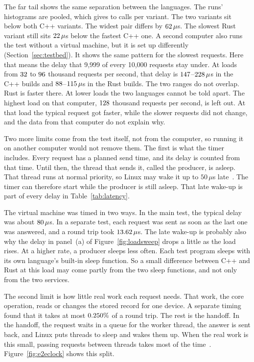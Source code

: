 \documentclass[english,oneside,a4paper,censored,csm,software-track-2020]{HYthesisML}
\begin{document}
The far tail shows the same separation between the languages.
The runs' histograms are pooled, which
gives \FarTailSamplesMin{} to \FarTailSamplesMax{} calls per variant. The
two \FarTailLower{} variants sit below both C++ variants. The widest pair
differs by $62\,\mu$s. The slowest Rust variant still sits
$22\,\mu$s below the fastest C++ one. A second computer also runs the test without a virtual machine, but it is set
up differently (Section~\ref{sec:testbed}). It shows the same pattern for the
slowest requests. Here that means the delay that 9{,}999 of every 10{,}000
requests stay under. At loads from $32$ to $96$
thousand requests per second, that delay is
$147$--$228\,\mu$s in the C++ builds and
$88$--$115\,\mu$s in the Rust builds. The two ranges
do not overlap. Rust is faster there. At lower loads the two languages cannot
be told apart. The highest load on that computer, $128$ thousand
requests per second, is left out. At that load the typical request got faster,
while the slower requests did not change, and the data from that computer do
not explain why.

Two more limits come from the test itself, not from the computer, so running it
on another computer would not remove them. The first is what the timer
includes. Every request has a planned send time, and its delay is counted from
that time. Until then, the thread that sends it, called the producer, is
asleep. That thread runs at normal priority, so Linux may wake it up to
$50\,\mu$s late~\cite{linux2026timerslack}. The timer can therefore start while
the producer is still asleep. That late wake-up is part of every delay in
Table~\ref{tab:latency}.

The virtual machine was timed in two ways. In the main test, the typical delay
was about $80\,\mu$s. In a separate test, each request was sent as
soon as the last one was answered, and a round trip took $13.62\,\mu$s.
The late wake-up is probably also why the delay in panel~(a) of
Figure~\ref{fig:loadsweep} drops a little as the load rises. At a higher rate,
a producer sleeps less often. Each test program sleeps with its own language's
built-in sleep function. So a small difference between C++ and Rust at this
load may come partly from the two sleep functions, and not only from the two
services.

The second limit is how little real work each request needs. That work, the
core operation, reads or changes the stored record for one device. A separate
timing found that it takes at most $0.250\%$ of a round trip. The
rest is the handoff. In the handoff, the request waits in a queue for the
worker thread, the answer is sent back, and Linux puts threads to sleep and
wakes them up. When the real work is this small, passing requests between
threads takes most of the time~\cite{zhou2025oltp}. Figure~\ref{fig:e2eclock}
shows this split.
\end{document}
